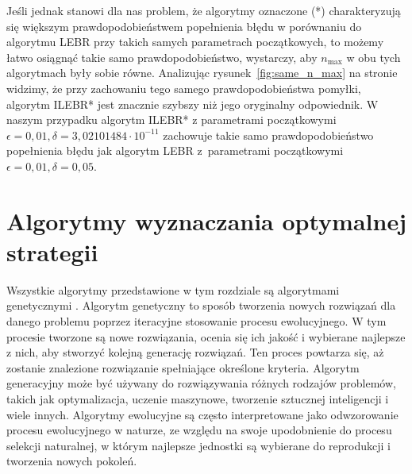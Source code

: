 \documentclass[inzynierska]{pwr_wmat_praca_dyplomowa}
\theoremstyle{plain}
\numberwithin{theorem}{chapter}
\theoremstyle{definition}
\numberwithin{theorem}{chapter}
\newcommand{\nmax}{n_{\text{max}}}
\begin{document}
	Jeśli jednak stanowi dla nas problem, że algorytmy oznaczone (*) charakteryzują się większym prawdopodobieństwem popełnienia błędu w porównaniu do algorytmu LEBR przy takich samych parametrach początkowych, to możemy łatwo osiągnąć takie samo prawdopodobieństwo, wystarczy, aby $\nmax$ w obu tych algorytmach były sobie równe.
	Analizując rysunek~\ref{fig:same_n_max} na stronie \pageref{fig:same_n_max} widzimy, że przy zachowaniu tego samego prawdopodobieństwa pomyłki, algorytm ILEBR* jest znacznie szybszy niż jego oryginalny odpowiednik. W naszym przypadku algorytm ILEBR* z parametrami początkowymi $\epsilon =0,01, \delta =3,02101484 \cdot 10^{-11}$ zachowuje takie samo prawdopodobieństwo popełnienia błędu jak algorytm LEBR z~parametrami początkowymi $\epsilon=0,01, \delta=0,05$.

	
	
	\chapter{Algorytmy wyznaczania optymalnej strategii}
	Wszystkie algorytmy przedstawione w tym rozdziale są algorytmami genetycznymi \cite{Figielska2006}. 
	Algorytm genetyczny to sposób tworzenia nowych rozwiązań dla danego problemu poprzez iteracyjne stosowanie procesu ewolucyjnego. W tym procesie tworzone są nowe rozwiązania, ocenia się ich jakość i wybierane najlepsze z nich, aby stworzyć kolejną generację rozwiązań. Ten proces powtarza się, aż zostanie znalezione rozwiązanie spełniające określone kryteria. Algorytm generacyjny może być używany do rozwiązywania różnych rodzajów problemów, takich jak optymalizacja, uczenie maszynowe, tworzenie sztucznej inteligencji i wiele innych. Algorytmy ewolucyjne są często interpretowane jako odwzorowanie procesu ewolucyjnego w naturze, ze względu na swoje upodobnienie do procesu selekcji naturalnej, w którym najlepsze jednostki są wybierane do reprodukcji i tworzenia nowych pokoleń.
	
\end{document}
